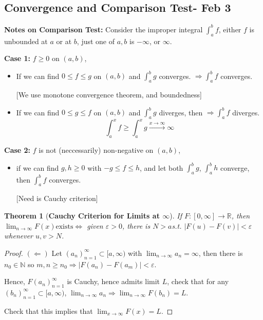 \documentclass[12pt]{article}
\theoremstyle{plain}
\newtheorem{theorem}{Theorem}[subsection]
\newcommand{\abs}[1]{\left| #1 \right|}
\newcommand{\mN}{{\mathbb{N}}}
\newcommand{\mR}{{\mathbb{R}}}
\newcommand{\ep}{\varepsilon}
\begin{document}
\newpage
\subsection{Convergence and Comparison Test- Feb 3}


\textbf{Notes on Comparison Test:}
Consider the improper integral $\int_a^b f$, 
either $f$ is unbounded at $a$ or at $b$, just one of $a,b$ is $-\infty$,
or $\infty$. 

\textbf{Case 1: }$f\geq 0$ on $(a,b)$, 
\begin{itemize}
	\item If we can find $0\leq f \leq g$ on $(a,b)$ and $\int_a^b g$ converges.
		$\Rightarrow \int_a^b f$ converges. 

		[We use monotone convergence theorem, and boundedness]
	
	\item 
		If we can find $0\leq g \leq f$ on $(a,b)$ and $\int_a^b g$ diverges, 
		then $\Rightarrow \int_a^b f$ diverges. 
		\[
			\int_a^x f \geq \int_a^x g \overset{x\to \infty}{\longrightarrow}
			\infty
		\]
\end{itemize}
\textbf{Case 2:}
$f$ is not (neccessarily) non-negative on $(a,b)$, 
\begin{itemize}
	\item if we can find $g, h \geq 0$ with $-g \leq f \leq h$, and let
		both $\int_a^b g$, $\int_a^b h$ converge, then $\int_a^b f$ converges. 

		[Need is Cauchy criterion]\\
\end{itemize}


\begin{theorem}[\textbf{Cauchy Criterion for Limits at $\infty$}]
	If $F : [0,\infty] \to \mR$, then
	$\lim_{n\to\infty} F(x) \text{exists} \iff$ given $\ep>0$, there is 
	$N>a$s.t. $\abs{F(u)-F(v)}<\ep$ whenever $u,v > N$. 
\end{theorem}
\begin{proof}
	$(\Leftarrow)$ Let $(a_n)_{n=1}^{\infty} \subset [a,\infty)$ with
	$\lim_{n\to\infty} a_n = \infty$, then there is $n_0 \in \mN$ so 
	$m,n \geq n_0 \Rightarrow \abs{F(a_n) - F(a_m)} < \ep$.

	Hence, $F(a_n)_{n=1}^{\infty}$ is Cauchy, hence admits limit $L$, 
	check that for any $(b_n)_{n=1}^{\infty} \subset [a,\infty)$, 
	$\lim_{n\to\infty} a_n \Rightarrow \lim_{n\to\infty} F(b_n) = L$.

	Check that this implies that $\lim_{x\to \infty} F(x) = L$. 
\end{proof}
\end{document}
